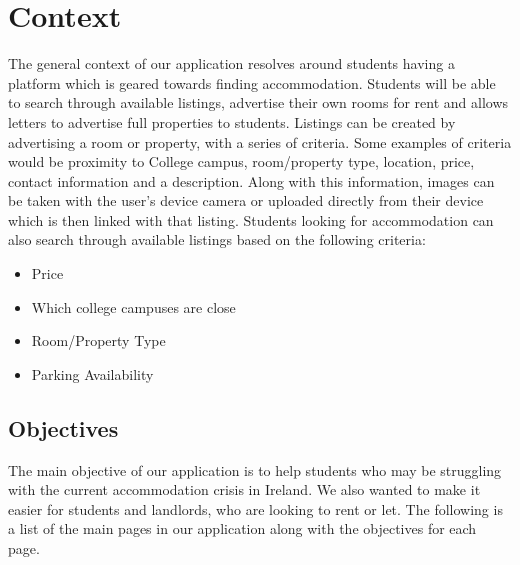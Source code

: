 \chapter{Context}
The general context of our application resolves around students having a platform which is geared towards finding accommodation. Students will be able to search through available listings, advertise their own rooms for rent and allows letters to advertise full properties to students. Listings can be created by advertising a room or property, with a series of criteria. Some examples of criteria would be proximity to College campus, room/property type, location, price, contact information and a description. Along with this information, images can be taken with the user’s device camera or uploaded directly from their device which is then linked with that listing. Students looking for accommodation can also search through available listings based on the following criteria: 

\begin{itemize}
  \item Price
  \item Which college campuses are close
  \item Room/Property Type
  \item Parking Availability
\end{itemize}

\section{Objectives}
The main objective of our application is to help students who may be struggling with the current accommodation crisis in Ireland. We also wanted to make it easier for students and landlords, who are looking to rent or let. The following is a list of the main pages in our application along with the objectives for each page. 

